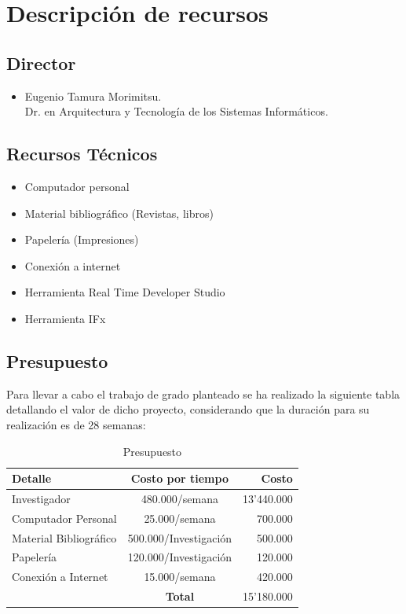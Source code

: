 \section{Descripci\'on de recursos}

\subsection{Director}

\begin{itemize}
 \item Eugenio Tamura Morimitsu.\\
 Dr. en Arquitectura y Tecnolog\'ia de los Sistemas Inform\'aticos.
 
\end{itemize}

\subsection{Recursos T\'ecnicos}

\begin{itemize}
 \item Computador personal
 \item Material bibliogr\'afico (Revistas, libros)
 \item Papeler\'ia (Impresiones)
\item Conexi\'on a internet
\item Herramienta Real Time Developer Studio 
\item Herramienta IFx
\end{itemize}

\subsection{Presupuesto}

Para llevar a cabo el trabajo de grado planteado se ha realizado la siguiente 
tabla detallando el valor de dicho proyecto, considerando que la duraci\'on para 
su realizaci\'on es de 28  semanas:

\begin{table}[H]
  \centering
  \begin{tabular}{|l|c|r|}
    \hline \hline
    \textbf{Detalle} & \textbf{Costo por tiempo} & \textbf{Costo} \\ 
    \hline
    Investigador                   & 480.000/semana & 13'440.000 \\ \hline
    Computador Personal            & 25.000/semana & 700.000\\ \hline
    Material Bibliogr\'afico       & 500.000/Investigaci\'on & 500.000\\ \hline
    Papeler\'ia  & 120.000/Investigaci\'on & 120.000\\ \hline
    Conexi\'on a Internet & 15.000/semana& 420.000 \\ \hline
    \hline
    \hfill &  \textbf{Total}           & 15'180.000 \\
    \hline
  \end{tabular}
  \caption{Presupuesto}
  \label{tab:presupuesto}
\end{table}

